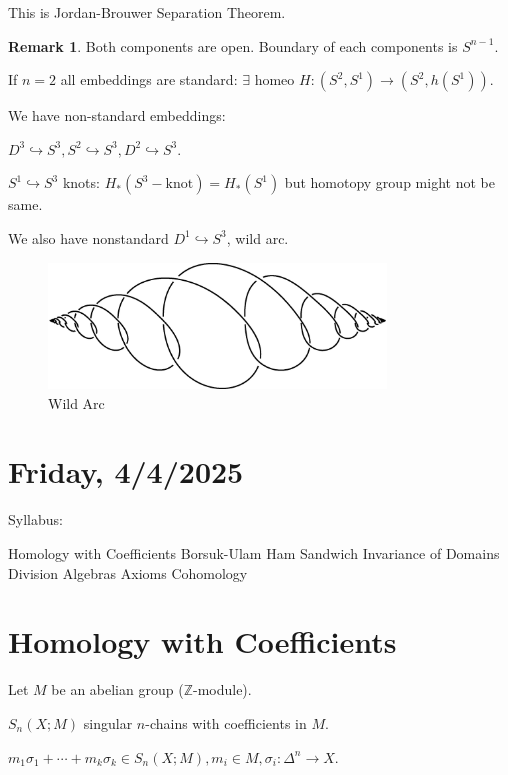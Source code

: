\documentclass{article}
\theoremstyle{definition}
\newtheorem*{remark}{Remark}
\begin{document}
    This is Jordan-Brouwer Separation Theorem.

    \begin{remark}
        Both components are open. Boundary of each components is \(S^{n-1}\).
    \end{remark}

    If \(n=2\) all embeddings are standard: \(\exists\) homeo \(H: (S^2, S^1) \to (S^2, h(S^1))\).

    We have non-standard embeddings:

    \(D^3 \hookrightarrow S^3, S^2 \hookrightarrow S^3, D^2 \hookrightarrow S^3\).

    \(S^1 \hookrightarrow S^3\) knots: \(H_{\ast} (S^3 - \text{knot}) = H_{\ast} (S^1)\) but homotopy group might not be same.
    
    We also have nonstandard \(D^1 \hookrightarrow S^3\), wild arc.

    \begin{figure}[H]
        \centering
        \includegraphics[width=0.8\textwidth]{img/wildarc}
        \caption{Wild Arc}
    \end{figure}

    \section*{Friday, 4/4/2025}
    
    Syllabus:

    Homology with Coefficients
    Borsuk-Ulam
    Ham Sandwich
    Invariance of Domains
    Division Algebras
    Axioms
    Cohomology

    \section*{Homology with Coefficients}

    Let \(M\) be an abelian group (\(\mathbb{Z}\)-module).

    \(S_n(X;M)\) singular \(n\)-chains with coefficients in \(M\).

    \(m_1 \sigma_1 + \cdots + m_k \sigma_k \in S_n(X;M), m_i \in M, \sigma_i : \Delta^n \to X\).
\end{document}
